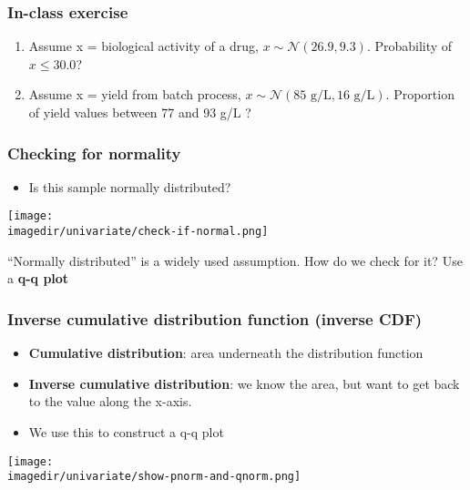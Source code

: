 \begin{frame}\frametitle{In-class exercise}
	\begin{enumerate}
		\item	Assume x = biological activity of a drug, $x \sim \mathcal{N}(26.9, 9.3)$. Probability of $x \leq 30.0$?
		\item	Assume x = yield from batch process, $x \sim \mathcal{N}(85 \text{~g/L}, 16 \text{~g/L})$. Proportion of yield values between 77 and 93 g/L ?
	\end{enumerate}
\end{frame}

\begin{frame}\frametitle{Checking for normality}
	\begin{itemize}
		\item	Is this sample normally distributed?
	\end{itemize}
	\begin{center}
		\texttt{[image: \\imagedir/univariate/check-if-normal.png]}
	\end{center}
	``Normally distributed'' is a widely used assumption. How do we check for it? Use a \textbf{q-q plot}
\end{frame}

\begin{frame}\frametitle{Inverse cumulative distribution function (inverse CDF)}
	\begin{itemize}
		\item	\textbf{Cumulative distribution}: area underneath the distribution function
		\item	\textbf{Inverse cumulative distribution}: we know the area, but want to get back to the value along the x-axis.
		\item	We use this to construct a q-q plot
	\end{itemize}
	\vspace{-4pt}
	\begin{center}
		\texttt{[image: \\imagedir/univariate/show-pnorm-and-qnorm.png]}
	\end{center}
\end{frame}

